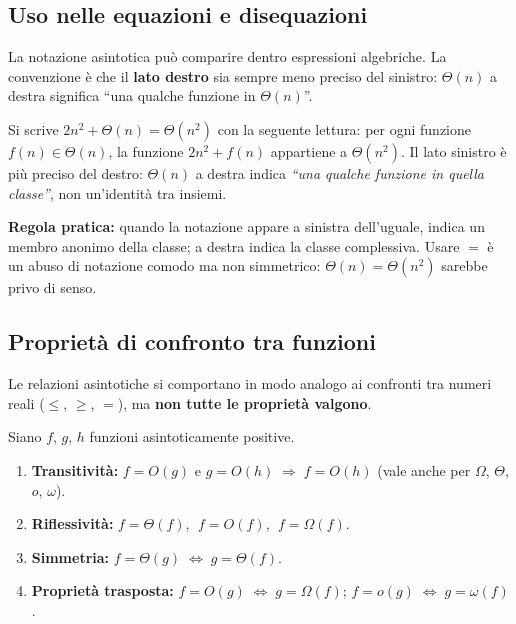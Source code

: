\subsection{Uso nelle equazioni e disequazioni}

\begin{softnote}
	La notazione asintotica può comparire dentro espressioni algebriche.
	La convenzione è che il \textbf{lato destro} sia sempre meno preciso del sinistro:
	$\Theta(n)$ a destra significa ``una qualche funzione in $\Theta(n)$''.
\end{softnote}

\begin{osservazione}
	Si scrive $2n^2 + \Theta(n) = \Theta(n^2)$ con la seguente lettura: per ogni
	funzione $f(n)\in\Theta(n)$, la funzione $2n^2+f(n)$ appartiene a $\Theta(n^2)$.
	Il lato sinistro è più preciso del destro: $\Theta(n)$ a destra indica
	\textit{``una qualche funzione in quella classe''}, non un'identità tra insiemi.
\end{osservazione}

\begin{nota}
	\textbf{Regola pratica:} quando la notazione appare a sinistra dell'uguale,
	indica un membro anonimo della classe; a destra indica la classe complessiva.
	Usare $=$ è un abuso di notazione comodo ma non simmetrico:
	$\Theta(n) = \Theta(n^2)$ sarebbe privo di senso.
\end{nota}

\subsection{Proprietà di confronto tra funzioni}

\begin{softnote}
	Le relazioni asintotiche si comportano in modo analogo ai confronti tra
	numeri reali ($\le$, $\ge$, $=$), ma \textbf{non tutte le proprietà valgono}.
\end{softnote}

Siano $f$, $g$, $h$ funzioni asintoticamente positive.

\begin{teorema}[Proprietà]
	\begin{enumerate}
		\item \textbf{Transitività:}
		$f = O(g)$ e $g = O(h) \;\Rightarrow\; f = O(h)$
		(vale anche per $\Omega$, $\Theta$, $o$, $\omega$).
		\item \textbf{Riflessività:}
		$f = \Theta(f)$, $\;f = O(f)$, $\;f = \Omega(f)$.
		\item \textbf{Simmetria:}
		$f = \Theta(g) \;\Leftrightarrow\; g = \Theta(f)$.
		\item \textbf{Proprietà trasposta:}
		$f = O(g) \;\Leftrightarrow\; g = \Omega(f)$; \quad
		$f = o(g) \;\Leftrightarrow\; g = \omega(f)$.
	\end{enumerate}
\end{teorema}

